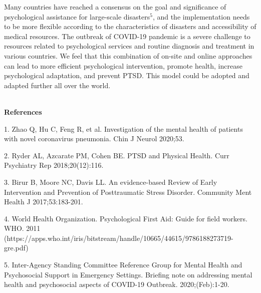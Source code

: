 \documentclass[
]{article}
\begin{document}
Many countries have reached a consensus on the goal and significance of psychological assistance for large-scale disasters$^5$, and the implementation needs to be more flexible according to the characteristics of disasters and accessibility of medical resources. The outbreak of COVID-19 pandemic is a severe challenge to resources related to psychological services and routine diagnosis and treatment in various countries. We feel that this combination of on-site and online approaches can lead to more efficient psychological intervention, promote health, increase psychological adaptation, and prevent PTSD. This model could be adopted and adapted further all over the world.

\\
\textbf{References}

1. Zhao Q, Hu C, Feng R, et al. Investigation of the mental health of patients with novel coronavirus pneumonia. Chin J Neurol 2020;53.

2. Ryder AL, Azcarate PM, Cohen BE. PTSD and Physical Health. Curr Psychiatry Rep 2018;20(12):116.

3. Birur B, Moore NC, Davis LL. An evidence-based Review of Early Intervention and Prevention of Posttraumatic Stress Disorder. Community Ment Health J 2017;53:183-201.

4. World Health Organization. Psychological First Aid: Guide for field workers. WHO. 2011 (https://apps.who.int/iris/bitstream/handle/10665/44615/9786188273719-gre.pdf)

5. Inter-Agency Standing Committee Reference Group for Mental Health and Psychosocial Support in Emergency Settings. Briefing note on addressing mental health and psychosocial aspects of COVID-19 Outbreak. 2020;(Feb):1-20.
\end{document}
